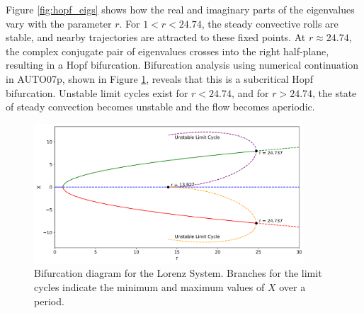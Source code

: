 \documentclass[paper=a4, fontsize=11pt]{scrartcl}
\numberwithin{equation}{section}		%
\numberwithin{figure}{section}			%
\numberwithin{table}{section}				%
\begin{document}
Figure \ref{fig:hopf_eigs} shows how the real and imaginary parts of the eigenvalues vary with the parameter $r$. For $1 < r < 24.74$, the steady convective rolls are stable, and nearby trajectories are attracted to these fixed points. At $r \approx 24.74$, the complex conjugate pair of eigenvalues crosses into the right half-plane, resulting in a Hopf bifurcation. Bifurcation analysis using numerical continuation in AUTO07p, shown in Figure \ref{fig:bifdiag}, reveals that this is a subcritical Hopf bifurcation. Unstable limit cycles exist for $r < 24.74$, and for $r > 24.74$, the state of steady convection becomes unstable and the flow becomes aperiodic.\\

\begin{figure}[hbt!]
	\centering
	\includegraphics[width=0.9\textwidth]{media/bifurcation_diagram.png}
	\caption{Bifurcation diagram for the Lorenz System. Branches for the limit cycles indicate the minimum and maximum values of $X$ over a period.}
	\label{fig:bifdiag}
\end{figure}
\end{document}
